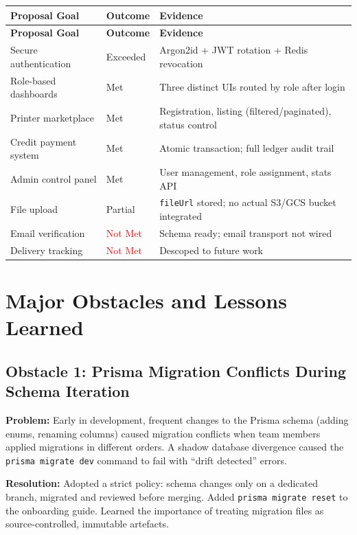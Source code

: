 \documentclass[12pt,a4paper]{report}
\begin{document}
\begin{longtable}{L{5cm} L{4cm} L{5.5cm}}
  \toprule
  \textbf{Proposal Goal} & \textbf{Outcome} & \textbf{Evidence} \\
  \midrule
  \endfirsthead
  \midrule
  \textbf{Proposal Goal} & \textbf{Outcome} & \textbf{Evidence} \\
  \midrule
  \endhead
  \bottomrule
  \endfoot
  Secure authentication & \textcolor{secondary}{Exceeded} & Argon2id + JWT rotation + Redis revocation \\
  Role-based dashboards & \textcolor{secondary}{Met} & Three distinct UIs routed by role after login \\
  Printer marketplace & \textcolor{secondary}{Met} & Registration, listing (filtered/paginated), status control \\
  Credit payment system & \textcolor{secondary}{Met} & Atomic transaction; full ledger audit trail \\
  Admin control panel & \textcolor{secondary}{Met} & User management, role assignment, stats API \\
  File upload & \textcolor{accent}{Partial} & \texttt{fileUrl} stored; no actual S3/GCS bucket integrated \\
  Email verification & \textcolor{red}{Not Met} & Schema ready; email transport not wired \\
  Delivery tracking & \textcolor{red}{Not Met} & Descoped to future work \\
\end{longtable}

\section{Major Obstacles and Lessons Learned}

\subsection{Obstacle 1: Prisma Migration Conflicts During Schema Iteration}

\textbf{Problem:} Early in development, frequent changes to the Prisma schema (adding enums,
renaming columns) caused migration conflicts when team members applied migrations in different
orders. A shadow database divergence caused the \texttt{prisma migrate dev} command to fail
with ``drift detected'' errors.

\textbf{Resolution:} Adopted a strict policy: schema changes only on a dedicated branch,
migrated and reviewed before merging. Added \texttt{prisma migrate reset} to the onboarding
guide. Learned the importance of treating migration files as source-controlled, immutable
artefacts.
\end{document}
